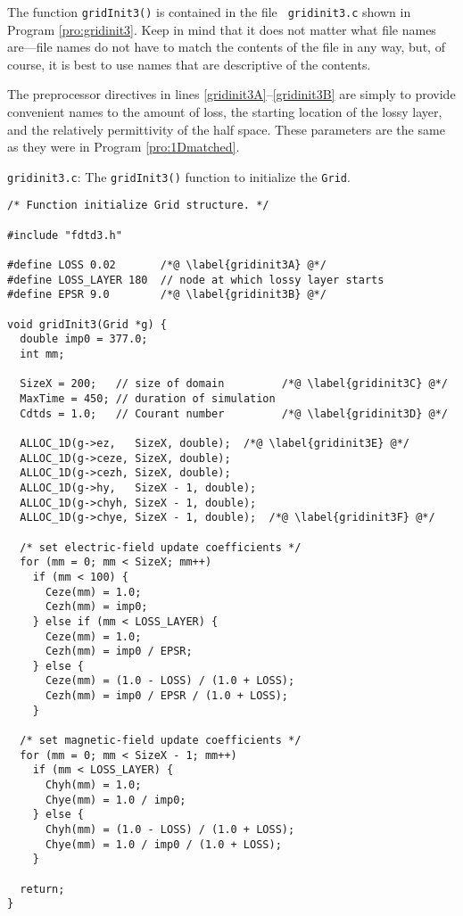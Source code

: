 The function {\tt gridInit3()} is contained in the file {\tt
  gridinit3.c} shown in Program \ref{pro:gridinit3}.  Keep in mind
that it does not matter what file names are---file names do not have
to match the contents of the file in any way, but, of course, it is
best to use names that are descriptive of the contents.

The preprocessor directives in lines
\ref{gridinit3A}--\ref{gridinit3B} are simply to provide convenient
names to the amount of loss, the starting location of the lossy layer,
and the relatively permittivity of the half space.  These parameters
are the same as they were in Program \ref{pro:1Dmatched}.

\begin{program} {\tt gridinit3.c}: The {\tt gridInit3()} function to
  initialize the {\tt Grid}.
\label{pro:gridinit3}
\codemiddle
\begin{lstlisting}
/* Function initialize Grid structure. */

#include "fdtd3.h"

#define LOSS 0.02       /*@ \label{gridinit3A} @*/
#define LOSS_LAYER 180  // node at which lossy layer starts
#define EPSR 9.0        /*@ \label{gridinit3B} @*/

void gridInit3(Grid *g) {
  double imp0 = 377.0;
  int mm;

  SizeX = 200;   // size of domain         /*@ \label{gridinit3C} @*/
  MaxTime = 450; // duration of simulation
  Cdtds = 1.0;   // Courant number         /*@ \label{gridinit3D} @*/

  ALLOC_1D(g->ez,   SizeX, double);  /*@ \label{gridinit3E} @*/
  ALLOC_1D(g->ceze, SizeX, double);
  ALLOC_1D(g->cezh, SizeX, double);
  ALLOC_1D(g->hy,   SizeX - 1, double);
  ALLOC_1D(g->chyh, SizeX - 1, double);
  ALLOC_1D(g->chye, SizeX - 1, double);  /*@ \label{gridinit3F} @*/
  
  /* set electric-field update coefficients */
  for (mm = 0; mm < SizeX; mm++)
    if (mm < 100) {
      Ceze(mm) = 1.0;
      Cezh(mm) = imp0;
    } else if (mm < LOSS_LAYER) {
      Ceze(mm) = 1.0;
      Cezh(mm) = imp0 / EPSR;
    } else {
      Ceze(mm) = (1.0 - LOSS) / (1.0 + LOSS);
      Cezh(mm) = imp0 / EPSR / (1.0 + LOSS);
    }

  /* set magnetic-field update coefficients */
  for (mm = 0; mm < SizeX - 1; mm++)
    if (mm < LOSS_LAYER) {
      Chyh(mm) = 1.0;
      Chye(mm) = 1.0 / imp0;
    } else {
      Chyh(mm) = (1.0 - LOSS) / (1.0 + LOSS);
      Chye(mm) = 1.0 / imp0 / (1.0 + LOSS);
    }

  return;
}
\end{lstlisting}
\end{program}

